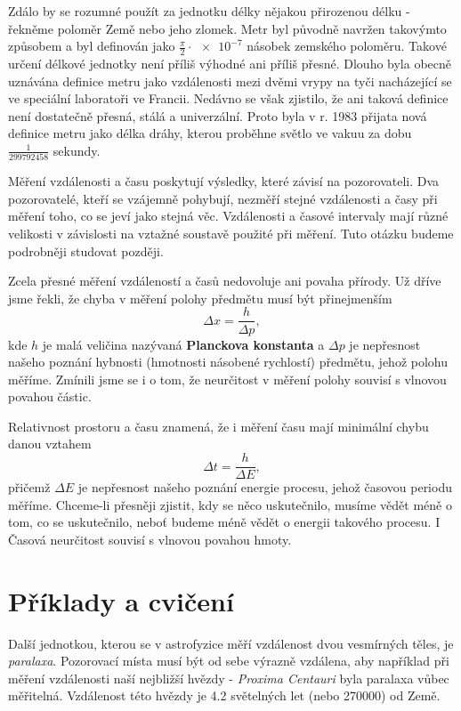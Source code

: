     Zdálo by se rozumné použít za jednotku délky nějakou přirozenou délku - řekněme poloměr Země 
    nebo jeho zlomek. Metr byl původně navržen takovýmto způsobem a byl definován jako 
    \(\frac{\pi}{2}\cdot\num{e-7}\) násobek zemského poloměru. Takové určení délkové jednotky není 
    příliš výhodné ani příliš přesné. Dlouho byla obecně uznávána definice metru jako vzdálenosti 
    mezi dvěmi vrypy na tyči nacházející se ve speciální laboratoři ve Francii. Nedávno se však 
    zjistilo, že ani taková definice není dostatečně přesná, stálá a univerzální. Proto byla v r. 
    1983 přijata nová definice metru jako délka dráhy, kterou proběhne světlo ve vakuu za dobu 
    \(\frac{\num{1}}{\num{299792458}}\) sekundy.
    
    Měření vzdálenosti a času poskytují výsledky, které závisí na pozorovateli. Dva pozorovatelé, 
    kteří se vzájemně pohybují, nezměří stejné vzdálenosti a časy při měření toho, co se jeví jako 
    stejná věc. Vzdálenosti a časové intervaly mají různé velikosti v závislosti na vztažné 
    soustavě použité při měření. Tuto otázku budeme podrobněji studovat později.
    
    Zcela přesné měření vzdáleností a časů nedovoluje ani povaha přírody. Už dříve jsme řekli, že 
    chyba v měření polohy předmětu musí být přinejmenším
    \begin{equation}\label{fyz:eq067}
      \Delta x = \frac{h}{\Delta p},
    \end{equation}
    kde \(h\) je malá veličina nazývaná \textbf{Planckova konstanta} a \(\Delta p\) je nepřesnost 
    našeho poznání hybnosti (hmotnosti násobené rychlostí) předmětu, jehož polohu měříme. Zmínili 
    jsme se i o tom, že neurčitost v měření polohy souvisí s vlnovou povahou částic.
    
    Relativnost prostoru a času znamená, že i měření času mají minimální chybu danou vztahem
    \begin{equation}\label{fyz:eq068}
      \Delta t = \frac{h}{\Delta E},
    \end{equation}
    přičemž \(\Delta E\) je nepřesnost našeho poznání energie procesu, jehož časovou periodu 
    měříme. Chceme-li přesněji zjistit, kdy se něco uskutečnilo, musíme vědět méně o tom, co se 
    uskutečnilo, neboť budeme méně vědět o energii takového procesu. I Časová neurčitost souvisí s 
    vlnovou povahou hmoty.

    \section{Příklady a cvičení}
      
      Další jednotkou, kterou se v astrofyzice měří vzdálenost dvou vesmírných těles, je 
      \emph{paralaxa}. Pozorovací místa musí být od sebe výrazně vzdálena, aby například při měření 
      vzdálenosti naší nejbližší hvězdy - \emph{Proxima Centauri} byla paralaxa vůbec měřitelná. 
      Vzdálenost této hvězdy je \num{4.2} světelných let (nebo \qty{270000}{\AU}) od Země.
        
